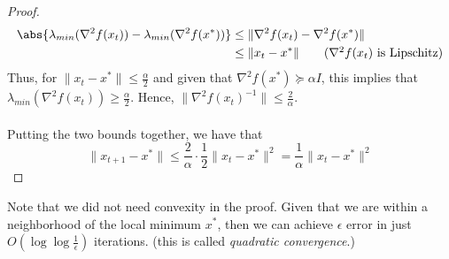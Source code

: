 \begin{proof}
\begin{align*}
\abs{\lambda_{min}(\nabla^2 f(x_t)) - \lambda_{min}(\nabla^2 f(x^*))} &\leq \|\nabla^2 f(x_t) - \nabla^2 f(x^*) \| \\
&\leq \|x_t - x^*\| \tag{$\nabla^2 f(x_t)$ is Lipschitz}
\end{align*}
Thus, for $\|x_t - x^*\| \leq \frac{\alpha}{2}$ and given that $\nabla^2 f(x^*) \succeq \alpha I$, this implies that $\lambda_{min}(\nabla^2 f(x_t)) \geq \frac{\alpha}{2}$. Hence, $\| \nabla^2 f(x_t)^{-1} \| \leq \frac{2}{\alpha}$.
\\
\\
Putting the two bounds together, we have that
$$\|x_{t+1} - x^*\| \leq \frac{2}{\alpha} \cdot \frac{1}{2} \|x_t - x^*\|^2 = \frac{1}{\alpha} \|x_t - x^*\|^2$$
\end{proof}
Note that we did not need convexity in the proof. Given that we are within a neighborhood of the local minimum $x^*$, then we can achieve $\epsilon$ error in just $O(\log \log \frac{1}{\epsilon})$ iterations. (this is called \emph{quadratic convergence}.)

